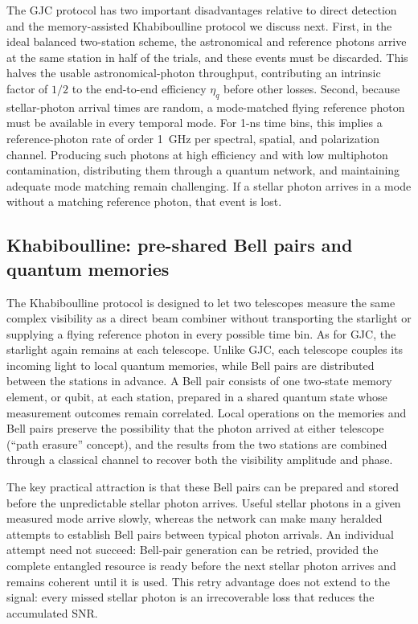 \documentclass[]{spie}
\begin{document}
The GJC protocol has two important disadvantages relative to direct detection and the memory-assisted Khabiboulline protocol we discuss next. First, in the ideal balanced two-station scheme, the astronomical and reference photons arrive at the same station in half of the trials, and these events must be discarded. This halves the usable astronomical-photon throughput, contributing an intrinsic factor of $1/2$ to the end-to-end efficiency $\eta_q$ before other losses. Second, because stellar-photon arrival times are random, a mode-matched flying reference photon must be available in every temporal mode. For 1-ns time bins, this implies a reference-photon rate of order 1~GHz per spectral, spatial, and polarization channel. Producing such photons at high efficiency and with low multiphoton contamination, distributing them through a quantum network, and maintaining adequate mode matching remain challenging. If a stellar photon arrives in a mode without a matching reference photon, that event is lost.\cite{Gottesman2012}

\subsection{Khabiboulline: pre-shared Bell pairs and quantum memories}

The Khabiboulline protocol is designed to let two telescopes measure the same complex visibility as a direct beam combiner without transporting the starlight or supplying a flying reference photon in every possible time bin. As for GJC, the starlight again remains at each telescope. Unlike GJC, each telescope couples its incoming light to local quantum memories, while Bell pairs are distributed between the stations in advance. A Bell pair consists of one two-state memory element, or qubit, at each station, prepared in a shared quantum state whose measurement outcomes remain correlated. Local operations on the memories and Bell pairs preserve the possibility that the photon arrived at either telescope (``path erasure'' concept), and the results from the two stations are combined through a classical channel to recover both the visibility amplitude and phase.\cite{Khabiboulline2019PRL,Khabiboulline2019PRA}

The key practical attraction is that these Bell pairs can be prepared and stored before the unpredictable stellar photon arrives. Useful stellar photons in a given measured mode arrive slowly, whereas the network can make many heralded attempts to establish Bell pairs between typical photon arrivals. An individual attempt need not succeed: Bell-pair generation can be retried, provided the complete entangled resource is ready before the next stellar photon arrives and remains coherent until it is used. This retry advantage does not extend to the signal: every missed stellar photon is an irrecoverable loss that reduces the accumulated SNR.
\end{document}
